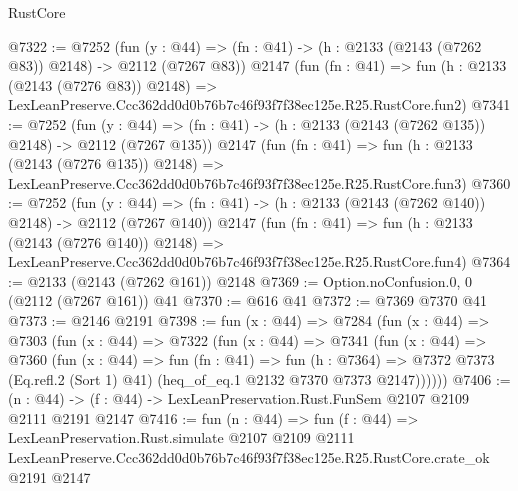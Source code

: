 \begin{lexlean}{RustCore}
\begin{coremodule}
@7322 := @7252
    (fun (y : @44) => (fn : @41) -> (h : @2133 (@2143 (@7262 @83)) @2148) -> @2112 (@7267 @83))
    @2147
    (fun (fn : @41) =>
    fun (h : @2133 (@2143 (@7276 @83)) @2148) =>
    LexLeanPreserve.Ccc362dd0d0b76b7c46f93f7f38ec125e.R25.RustCore.fun2)
@7341 := @7252
    (fun (y : @44) => (fn : @41) -> (h : @2133 (@2143 (@7262 @135)) @2148) -> @2112 (@7267 @135))
    @2147
    (fun (fn : @41) =>
    fun (h : @2133 (@2143 (@7276 @135)) @2148) =>
    LexLeanPreserve.Ccc362dd0d0b76b7c46f93f7f38ec125e.R25.RustCore.fun3)
@7360 := @7252
    (fun (y : @44) => (fn : @41) -> (h : @2133 (@2143 (@7262 @140)) @2148) -> @2112 (@7267 @140))
    @2147
    (fun (fn : @41) =>
    fun (h : @2133 (@2143 (@7276 @140)) @2148) =>
    LexLeanPreserve.Ccc362dd0d0b76b7c46f93f7f38ec125e.R25.RustCore.fun4)
@7364 := @2133 (@2143 (@7262 @161)) @2148
@7369 := Option.noConfusion.{0, 0} (@2112 (@7267 @161)) @41
@7370 := @616 @41
@7372 := @7369 @7370 @41
@7373 := @2146 @2191
@7398 := fun (x : @44) =>
  @7284
    (fun (x : @44) =>
    @7303
      (fun (x : @44) =>
      @7322
        (fun (x : @44) =>
        @7341
          (fun (x : @44) =>
          @7360
            (fun (x : @44) =>
            fun (fn : @41) =>
            fun (h : @7364) =>
            @7372 @7373 (Eq.refl.{2} (Sort 1) @41) (heq_of_eq.{1} @2132 @7370 @7373 @2147))))))
@7406 := (n : @44) -> (f : @44) -> LexLeanPreservation.Rust.FunSem @2107 @2109 @2111 @2191 @2147
@7416 := fun (n : @44) =>
  fun (f : @44) =>
  LexLeanPreservation.Rust.simulate
    @2107
    @2109
    @2111
    LexLeanPreserve.Ccc362dd0d0b76b7c46f93f7f38ec125e.R25.RustCore.crate_ok
    @2191
    @2147
\end{coremodule}
\end{lexlean}
